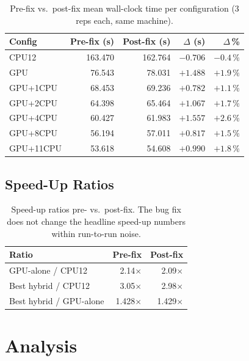 \documentclass[
	english,
	letterpaper, oneside
]{article}
\begin{document}
\begin{table}[H]
    \centering
    \caption{Pre-fix vs.\ post-fix mean wall-clock time per
             configuration (3 reps each, same machine).}
    \label{tab:compare-sweep}
    \begin{tabular}{lrrrr}
        \hline
        Config & Pre-fix (s) & Post-fix (s) & $\Delta$ (s) & $\Delta$\,\% \\
        \hline
        CPU12      & 163.470 & 162.764 & $-0.706$ & $-0.4\,\%$ \\
        GPU        &  76.543 &  78.031 & $+1.488$ & $+1.9\,\%$ \\
        GPU+1CPU   &  68.453 &  69.236 & $+0.782$ & $+1.1\,\%$ \\
        GPU+2CPU   &  64.398 &  65.464 & $+1.067$ & $+1.7\,\%$ \\
        GPU+4CPU   &  60.427 &  61.983 & $+1.557$ & $+2.6\,\%$ \\
        GPU+8CPU   &  56.194 &  57.011 & $+0.817$ & $+1.5\,\%$ \\
        GPU+11CPU  &  53.618 &  54.608 & $+0.990$ & $+1.8\,\%$ \\
        \hline
    \end{tabular}
\end{table}

\subsection{Speed-Up Ratios}

\begin{table}[H]
    \centering
    \caption{Speed-up ratios pre- vs.\ post-fix. The bug fix does not
             change the headline speed-up numbers within run-to-run
             noise.}
    \label{tab:speedup}
    \begin{tabular}{lrr}
        \hline
        Ratio & Pre-fix & Post-fix \\
        \hline
        GPU-alone / CPU12             & 2.14$\times$ & 2.09$\times$ \\
        Best hybrid / CPU12           & 3.05$\times$ & 2.98$\times$ \\
        Best hybrid / GPU-alone       & 1.428$\times$ & 1.429$\times$ \\
        \hline
    \end{tabular}
\end{table}

\section{Analysis}
\end{document}
